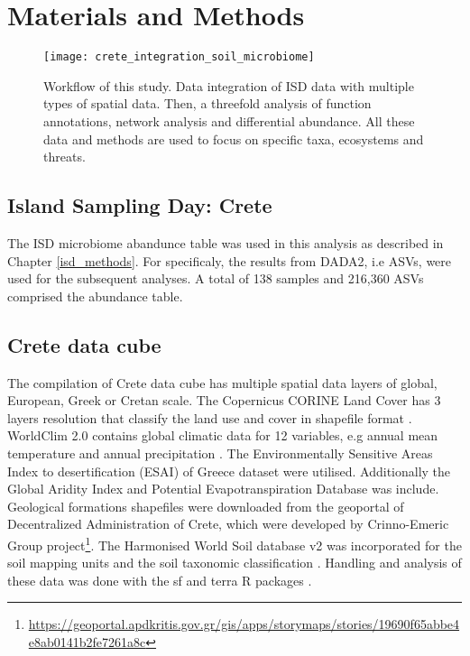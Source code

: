 \section{Materials and Methods}\label{integration_methods}

\begin{figure}[t] 
    \centering\texttt{[image: crete\_integration\_soil\_microbiome]}
    \caption{Workflow of this study. Data integration of ISD data with multiple types of spatial data. Then, a threefold analysis of function annotations, network analysis and differential abundance. All these data and methods are used to focus on specific taxa, ecosystems and threats.}
    \label{fig:workflow}
\end{figure}

\subsection{Island Sampling Day: Crete}\label{isd_data}
The ISD microbiome abandunce table was used in this analysis as described in Chapter \ref{isd_methods}.
For specificaly, the results from DADA2, i.e ASVs, were used for the subsequent analyses. A total of 
138 samples and 216,360 ASVs comprised the abundance table.

\subsection{Crete data cube}\label{spatial_data}

The compilation of Crete data cube has multiple spatial data layers of global,
European, Greek or Cretan scale. 
The Copernicus CORINE Land Cover has 3 layers resolution that classify the land
use and cover in shapefile format \parencite{CLC2023}. 
WorldClim 2.0 contains global climatic data for 12 variables, e.g annual mean
temperature and annual precipitation \parencite{Fick2017}.
The Environmentally Sensitive Areas Index to desertification (ESAI) 
of Greece dataset \parencite{KARAMESOUTI2018266} were utilised. Additionally the 
Global Aridity Index and Potential Evapotranspiration Database \parencite{zomer2022version} was include.
Geological formations shapefiles were downloaded from the geoportal of
Decentralized Administration of Crete, which were developed by
Crinno-Emeric Group project\footnote{\url{https://geoportal.apdkritis.gov.gr/gis/apps/storymaps/stories/19690f65abbe4e8ab0141b2fe7261a8c}}.
The Harmonised World Soil database v2 was incorporated for the soil mapping units and 
the soil taxonomic classification \parencite{fao2023}.
Handling and analysis of these data was done with the sf and terra R packages \parencite{Pebesma2023}.

